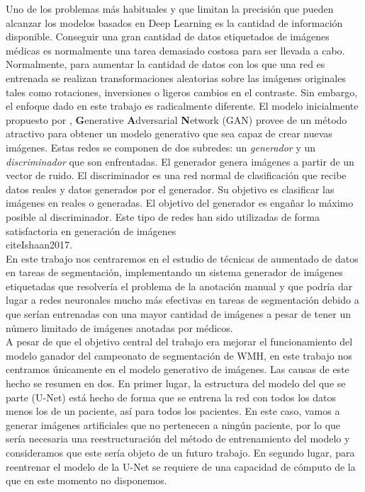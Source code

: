 \documentclass[spanish,a4paper, 11pt]{article}
\numberwithin{equation}{section}
\numberwithin{table}{section}
\numberwithin{figure}{section}
\begin{document}
Uno de los problemas más habituales y que limitan la precisión que pueden alcanzar los modelos basados en Deep Learning es la cantidad de información disponible. Conseguir una gran cantidad de datos etiquetados de imágenes médicas es normalmente una tarea demasiado costosa para ser llevada a cabo. Normalmente, para aumentar la cantidad de datos con los que una red es entrenada se realizan transformaciones aleatorias sobre las imágenes originales tales como rotaciones, inversiones o ligeros cambios en el contraste. Sin embargo, el enfoque dado en este trabajo es radicalmente diferente. El modelo inicialmente propuesto por \citet{Goodfellow2014}, \textbf{G}enerative \textbf{A}dversarial \textbf{N}etwork (GAN) provee de un método atractivo para obtener un modelo generativo que sea capaz de crear nuevas imágenes. Estas redes se componen de dos subredes: un \textit{generador} y un \textit{discriminador} que son enfrentadas. El generador genera imágenes a partir de un vector de ruido. El discriminador es una red normal de clasificación que recibe datos reales y datos generados por el generador. Su objetivo es clasificar las imágenes en reales o generadas. El objetivo del generador es engañar lo máximo posible al discriminador. Este tipo de redes han sido utilizadas de forma satisfactoria en generación de imágenes \\cite{Ishaan2017}.\\

En este trabajo nos centraremos en el estudio de técnicas de aumentado de datos en tareas de segmentación, implementando un sistema generador de imágenes etiquetadas que resolvería el problema de la anotación manual y que podría dar lugar a redes neuronales mucho más efectivas en tareas de segmentación debido a que serían entrenadas con una mayor cantidad de imágenes a pesar de tener un número limitado de imágenes anotadas por médicos.\\

A pesar de que el objetivo central del trabajo era mejorar el funcionamiento del modelo ganador del campeonato de segmentación de WMH, en este trabajo nos centramos únicamente en el modelo generativo de imágenes. Las causas de este hecho se resumen en dos. En primer lugar, la estructura del modelo del que se parte (U-Net) está hecho de forma que se entrena la red con todos los datos menos los de un paciente, así para todos los pacientes. En este caso, vamos a generar imágenes artificiales que no pertenecen a ningún paciente, por lo que sería necesaria una reestructuración del método de entrenamiento del modelo y consideramos que este sería objeto de un futuro trabajo. En segundo lugar, para reentrenar el modelo de la U-Net se requiere de una capacidad de cómputo de la que en este momento no disponemos.\\
\end{document}
